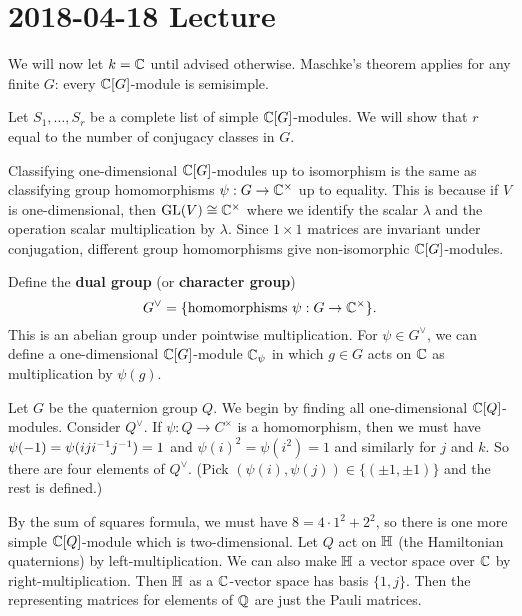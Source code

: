 \section{2018-04-18 Lecture}

\begin{rmk}
	We will now let $k=\mathbb{C}$ until advised otherwise.
	Maschke's theorem applies for any finite $G$: every $\mathbb{C}[G]$-module is semisimple.
\end{rmk}

Let $S_1,\ldots,S_r$ be a complete list of simple $\mathbb{C}[G]$-modules.
We will show that $r$ equal to the number of conjugacy classes in $G$.

\begin{rmk}
	Classifying one-dimensional $\mathbb{C}[G]$-modules up to isomorphism is the same as classifying group homomorphisms $\psi: G \to \mathbb{C}^\times$ up to equality.
	This is because if $V$ is one-dimensional, then $\operatorname{GL}(V) \cong \mathbb{C}^\times$ where we identify the scalar $\lambda$ and the operation scalar multiplication by $\lambda$.
	Since $1 \times 1$ matrices are invariant under conjugation, different group homomorphisms give non-isomorphic $\mathbb{C}[G]$-modules.
	
	Define the \textbf{dual group} (or \textbf{character group})
	\[G^\vee = \{\text{homomorphisms } \psi: G \to \mathbb{C}^\times\}.\]
	This is an abelian group under pointwise multiplication.
	For $\psi \in G^\vee$, we can define a one-dimensional $\mathbb{C}[G]$-module $\mathbb{C}_\psi$ in which $g \in G$ acts on $\mathbb{C}$ as multiplication by $\psi(g)$.
\end{rmk}

\begin{exam}
	Let $G$ be the quaternion group $Q$.
	We begin by finding all one-dimensional $\mathbb{C}[Q]$-modules.
	Consider $Q^\vee$.
	If $\psi: Q \to C^\times$ is a homomorphism, then we must have $\psi(-1) = \psi(iji^{-1} j^{-1}) = 1$ and $\psi(i)^2=\psi(i^2)=1$ and similarly for $j$ and $k$.
	So there are four elements of $Q^\vee$.
	(Pick $(\psi(i),\psi(j)) \in \{(\pm 1, \pm 1)\}$ and the rest is defined.)
	
	By the sum of squares formula, we must have $8=4 \cdot 1^2 + 2^2$, so there is one more simple $\mathbb{C}[Q]$-module which is two-dimensional.
	Let $Q$ act on $\mathbb{H}$ (the Hamiltonian quaternions) by left-multiplication.
	We can also make $\mathbb{H}$ a vector space over $\mathbb{C}$ by right-multiplication.
	Then $\mathbb{H}$ as a $\mathbb{C}$-vector space has basis $\{1,j\}$.
	Then the representing matrices for elements of $\mathbb{Q}$ are just the Pauli matrices.
\end{exam}

